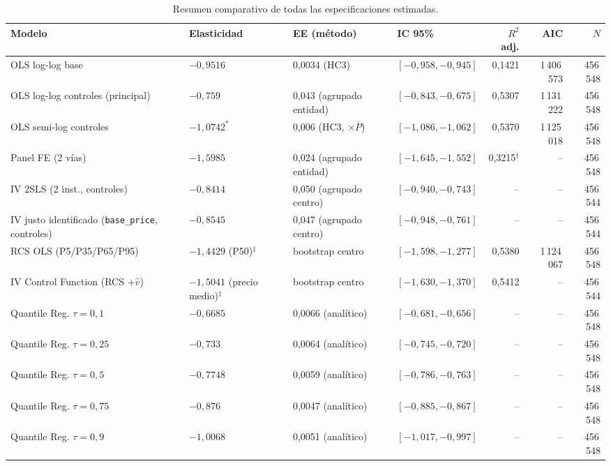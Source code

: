 \documentclass[doc, a4paper, biblatex, floatsintext, longtable, babel]{apa7}
\begin{document}
\begin{table}[!htbp]
\centering
\caption{Resumen comparativo de todas las especificaciones estimadas.}
\label{tab:appendix_spec_summary}
\scriptsize
\setlength{\tabcolsep}{3pt}
\begin{threeparttable}
\begin{tabular}{@{}p{3.6cm}p{2.3cm}p{2.5cm}p{2.7cm}rrr@{}}
\toprule
Modelo & Elasticidad & EE (método) & IC 95\% & $R^2$ adj. & AIC & $N$ \\
\midrule
OLS log-log base & $-0,9516$ & 0,0034 (HC3) & $[-0,958, -0,945]$ & 0,1421 & 1\,406\,573 & 456\,548 \\
OLS log-log controles (principal) & $-0,759$ & 0,043 (agrupado entidad) & $[-0,843, -0,675]$ & 0,5307 & 1\,131\,222 & 456\,548 \\
OLS semi-log controles & $-1,0742^{*}$ & 0,006 (HC3, $\times\bar{P}$) & $[-1,086, -1,062]$ & 0,5370 & 1\,125\,018 & 456\,548 \\
Panel FE (2 vías) & $-1,5985$ & 0,024 (agrupado entidad) & $[-1,645, -1,552]$ & 0,3215$^{\dagger}$ & -- & 456\,548 \\
IV 2SLS (2 inst., controles) & $-0,8414$ & 0,050 (agrupado centro) & $[-0,940, -0,743]$ & -- & -- & 456\,544 \\
IV justo identificado (\texttt{base\_price}, controles) & $-0,8545$ & 0,047 (agrupado centro) & $[-0,948, -0,761]$ & -- & -- & 456\,544 \\
RCS OLS (P5/P35/P65/P95) & $-1,4429$ (P50)$^{\ddagger}$ & bootstrap centro & $[-1,598, -1,277]$ & 0,5380 & 1\,124\,067 & 456\,548 \\
IV Control Function (RCS $+\hat{v}$) & $-1,5041$ (precio medio)$^{\ddagger}$ & bootstrap centro & $[-1,630, -1,370]$ & 0,5412 & -- & 456\,544 \\
Quantile Reg. $\tau=0,1$ & $-0,6685$ & 0,0066 (analítico) & $[-0,681, -0,656]$ & -- & -- & 456\,548 \\
Quantile Reg. $\tau=0,25$ & $-0,733$ & 0,0064 (analítico) & $[-0,745, -0,720]$ & -- & -- & 456\,548 \\
Quantile Reg. $\tau=0,5$ & $-0,7748$ & 0,0059 (analítico) & $[-0,786, -0,763]$ & -- & -- & 456\,548 \\
Quantile Reg. $\tau=0,75$ & $-0,876$ & 0,0047 (analítico) & $[-0,885, -0,867]$ & -- & -- & 456\,548 \\
Quantile Reg. $\tau=0,9$ & $-1,0068$ & 0,0051 (analítico) & $[-1,017, -0,997]$ & -- & -- & 456\,548 \\
\bottomrule
\end{tabular}

\end{threeparttable}
\end{table}
\end{document}

